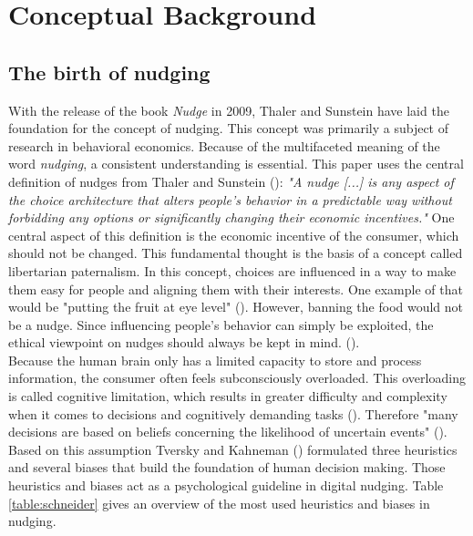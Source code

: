 \section{Conceptual Background}

\subsection{ The birth of nudging}
With the release of the book \textit{Nudge} in 2009, Thaler and Sunstein have laid the foundation for the concept of nudging. This concept was primarily a subject of research in behavioral economics. Because of the multifaceted meaning of the word \textit{nudging}, a consistent understanding is essential. This paper uses the central definition of nudges from Thaler and Sunstein (\citeyear[p.6]{thaler_nudge:_2009}): \textit{"A nudge [...] is any aspect of the choice architecture that alters people's behavior in a predictable way without forbidding any options or significantly changing their economic incentives."}
One central aspect of this definition is the economic incentive of the consumer, which should not be changed. This fundamental thought is the basis of a concept called libertarian paternalism. In this concept, choices are influenced in a way to make them easy for people and aligning them with their interests. One example of that would be "putting the fruit at eye level" (\cite[p.6]{thaler_nudge:_2009}). However, banning the food would not be a nudge. Since influencing people's behavior can simply be exploited, the ethical viewpoint on nudges should always be kept in mind. (\cite{sunstein_nudging_2015}).
\\

Because the human brain only has a limited capacity to store and process information, the consumer often feels subconsciously overloaded. This overloading is called cognitive limitation, which results in greater difficulty and complexity when it comes to decisions and cognitively demanding tasks (\cite{broniarczyk_decision_2014}). Therefore "many decisions are based on beliefs concerning the likelihood of uncertain events" (\cite[p.1124]{tversky_judgment_1974}). Based on this assumption Tversky and Kahneman (\citeyear{tversky_judgment_1974}) formulated three heuristics and several biases that build the foundation of human decision making. Those heuristics and biases act as a psychological guideline in digital nudging. Table \ref{table:schneider} gives an overview of the most used heuristics and biases in nudging.
\\

